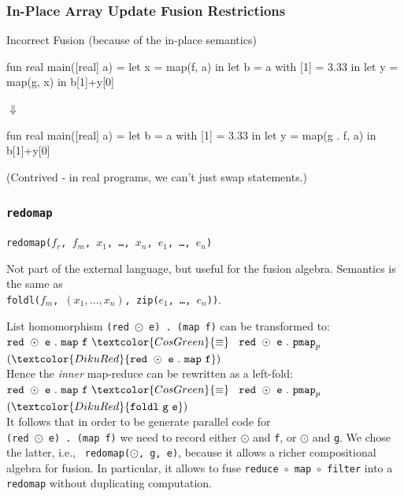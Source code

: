 \documentclass{beamer}
\newcommand{\emp}[1]{\textcolor{DikuRed}{ #1}}
\newcommand{\emphh}[1]{\textcolor{CosGreen}{ #1}}
\begin{document}
\begin{frame}[fragile,t]
  \frametitle{In-Place Array Update Fusion Restrictions}

  \begin{block}{Incorrect Fusion (because of the in-place semantics)}
    \begin{center}
      \begin{colorcode}[fontsize=\scriptsize]
fun real main([real] a) =
let x      = map(f, a)    in
let b = a with [1] = 3.33 in
let y      = map(g, x)    in
b[1]+y[0]
      \end{colorcode}
      $\Downarrow$
      \begin{colorcode}[fontsize=\scriptsize]
fun real main([real] a) =
let b = a with [1] = 3.33   in
let y      = map(g . f, a)  in
b[1]+y[0]
      \end{colorcode}
    \end{center}
  \end{block}

(Contrived - in real programs, we can't just swap statements.)

\end{frame}

\begin{frame}[fragile,t]
  \frametitle{{\tt redomap}}

  {\tt redomap($f_{r}$, $f_{m}$, $x_{1}$, \ldots, $x_{n}$, $e_{1}$, \ldots, $e_{n}$)}

  Not part of the external language, but useful for the fusion
  algebra.  Semantics is the same as\\{\tt foldl($f_{m}$, $(x_{1},\ldots,x_{n})$, zip($e_{1}$, \ldots, $e_{n}$))}.
\pause
\begin{block}{List homomorphism} {\tt (red $\odot$ e) . (map f)} can
  be transformed to:  \\
  ${\tt red}\mbox{ }\odot\mbox{ }{\tt e}\mbox{ }.\mbox{ }{\tt
    map}\mbox{ }{\tt f}\mbox{ }\emphh{\equiv}$ $\mbox{ }{\tt
    red}\mbox{ }\odot\mbox{ }{\tt e}\mbox{ }.\mbox{ }{\tt pmap}_{p}
  \mbox{ }$ $(\emp{{\tt red} \mbox{
    }\odot\mbox{ }{\tt e}\mbox{ }.\mbox{ }{\tt map}\mbox{ }{\tt f}})$\\
  Hence the {\em inner} map-reduce can be
  rewritten as a left-fold:\\
  ${\tt red}\mbox{ }\odot\mbox{ }{\tt e}\mbox{ }.\mbox{ }{\tt
    map}\mbox{ }{\tt f}\mbox{ }\emphh{\equiv}$ $\mbox{ }{\tt
    red}\mbox{ }\odot\mbox{ }{\tt e}\mbox{ }.\mbox{ }{\tt pmap}_{p}
  \mbox{ }$ $(\emp{{\tt foldl}\mbox{
    }{\tt g}\mbox{ }{\tt e}})$\\
  It follows that in order to be generate parallel code for \\
  {\tt (red $\odot$ e) . (map f)} we need to record either $\odot$ and
  {\tt f}, or $\odot$ and {\tt g}. We chose the latter, i.e., {\tt
    redomap($\odot$, g, e)}, because it allows a richer compositional
  algebra for fusion.  In particular, it allows to fuse {\tt reduce
    $\circ$ map $\circ$ filter} into a {\tt redomap} without
  duplicating computation.
\end{block}

\end{frame}
\end{document}
